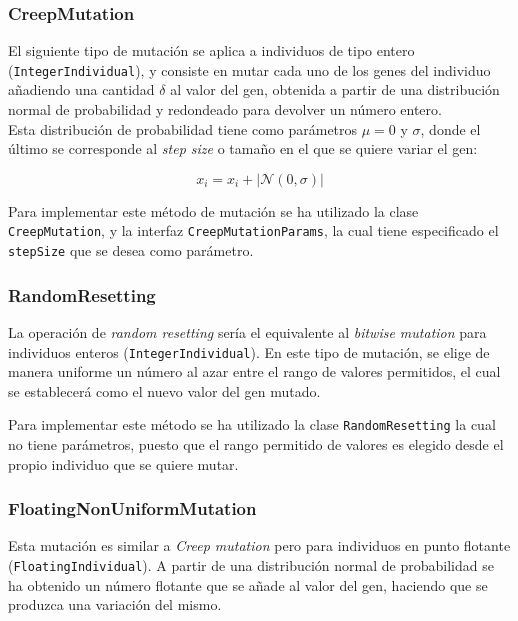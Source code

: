 \subsubsection{CreepMutation}

El siguiente tipo de mutación se aplica a individuos de tipo entero (\texttt{IntegerIndividual}), y consiste en mutar cada uno de los genes del individuo añadiendo una cantidad $\delta$ al valor del gen, obtenida a partir de una distribución normal de probabilidad y redondeado para devolver un número entero. \\

Esta distribución de probabilidad tiene como parámetros $\mu = 0$ y $\sigma$, donde el último se corresponde al \textit{step size} o tamaño en el que se quiere variar el gen:

\begin{equation}
    x_i = x_i + |\mathcal{N}(0, \sigma)|
\end{equation}

Para implementar este método de mutación se ha utilizado la clase \texttt{CreepMutation}, y la interfaz \texttt{CreepMutationParams}, la cual tiene especificado el \texttt{stepSize} que se desea como parámetro.

\subsubsection{RandomResetting}

La operación de \textit{random resetting} sería el equivalente al \textit{bitwise mutation} para individuos enteros (\texttt{IntegerIndividual}). En este tipo de mutación, se elige de manera uniforme un número al azar entre el rango de valores permitidos, el cual se establecerá como el nuevo valor del gen mutado.

Para implementar este método se ha utilizado la clase \texttt{RandomResetting} la cual no tiene parámetros, puesto que el rango permitido de valores es elegido desde el propio individuo que se quiere mutar.

\subsubsection{FloatingNonUniformMutation}

Esta mutación es similar a \textit{Creep mutation} pero para individuos en punto flotante (\texttt{FloatingIndividual}). A partir de una distribución normal de probabilidad se ha obtenido un número flotante que se añade al valor del gen, haciendo que se produzca una variación del mismo.

